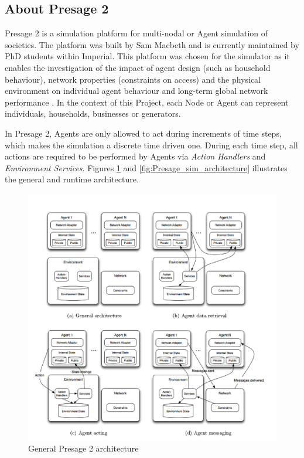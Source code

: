 \subsection*{About Presage 2}
Presage 2 is a simulation platform for multi-nodal or Agent simulation of societies. The platform was built by Sam Macbeth and is currently maintained by PhD students within Imperial. This platform was chosen for the simulator as it enables the investigation of the impact of agent design (such as household behaviour), network properties (constraints on access) and the physical environment on individual agent behaviour and long-term global network performance \cite{Presage2-Desc:2015}. In the context of this Project, each Node or Agent can represent individuals, households, businesses or generators. 

In Presage 2, Agents are only allowed to act during increments of time steps, which makes the simulation a discrete time driven one. During each time step, all actions are required to be performed by Agents via \textit{Action Handlers} and \textit{Environment Services}. Figures \ref{fig:Presage_architecture} and \ref{fig:Presage_sim_architecture} illustrates the general and runtime architecture.

\begin{figure}[h!]
	\centering
	\includegraphics[scale=0.25]{Images/Presage.jpg}
	\caption{General Presage 2 architecture \cite{Presage_Kyoto:2015}}
	\label{fig:Presage_architecture}
\end{figure}

